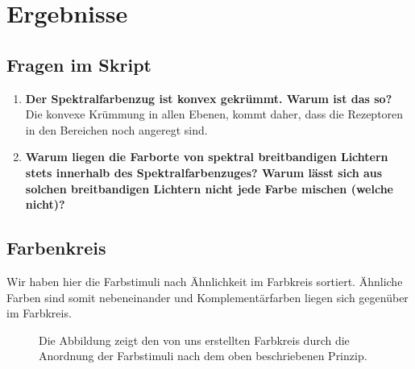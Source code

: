 \documentclass[11pt]{article}
\begin{document}
\section{Ergebnisse}
\subsection{Fragen im Skript}
\begin{enumerate}
\item \textbf{Der Spektralfarbenzug ist konvex gekrümmt. Warum ist das so?}\\
Die konvexe Krümmung in allen Ebenen, kommt daher, dass die Rezeptoren in den Bereichen noch angeregt sind.

\item \textbf{Warum liegen die Farborte von spektral breitbandigen Lichtern stets innerhalb des Spektralfarbenzuges? Warum lässt sich aus solchen breitbandigen Lichtern nicht jede Farbe mischen (welche nicht)?}


\end{enumerate}

\subsection{Farbenkreis}
Wir haben hier die Farbstimuli nach Ähnlichkeit im Farbkreis sortiert. Ähnliche Farben sind somit nebeneinander und Komplementärfarben liegen sich gegenüber im Farbkreis. 
\begin{figure}[H]
\caption{Die Abbildung zeigt den von uns erstellten Farbkreis durch die Anordnung der Farbstimuli nach dem oben beschriebenen Prinzip.}
\label{farbkreis}
\end{figure}
\end{document}
